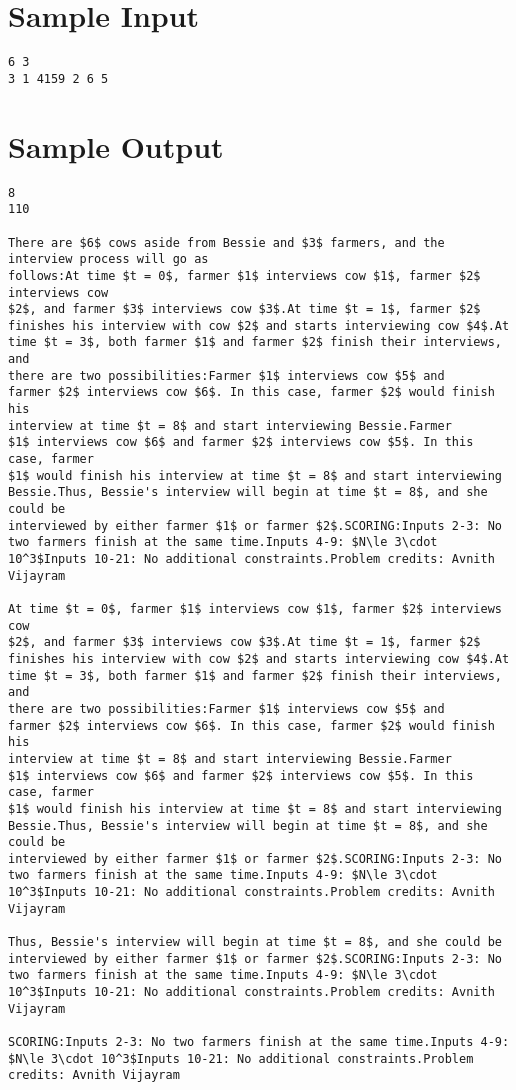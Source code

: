 \documentclass[12pt]{article}
\begin{document}
\section*{Sample Input}
\begin{verbatim}
6 3
3 1 4159 2 6 5
\end{verbatim}

\section*{Sample Output}
\begin{verbatim}
8
110

There are $6$ cows aside from Bessie and $3$ farmers, and the interview process will go as
follows:At time $t = 0$, farmer $1$ interviews cow $1$, farmer $2$ interviews cow
$2$, and farmer $3$ interviews cow $3$.At time $t = 1$, farmer $2$
finishes his interview with cow $2$ and starts interviewing cow $4$.At time $t = 3$, both farmer $1$ and farmer $2$ finish their interviews, and
there are two possibilities:Farmer $1$ interviews cow $5$ and
farmer $2$ interviews cow $6$. In this case, farmer $2$ would finish his
interview at time $t = 8$ and start interviewing Bessie.Farmer
$1$ interviews cow $6$ and farmer $2$ interviews cow $5$. In this case, farmer
$1$ would finish his interview at time $t = 8$ and start interviewing
Bessie.Thus, Bessie's interview will begin at time $t = 8$, and she could be
interviewed by either farmer $1$ or farmer $2$.SCORING:Inputs 2-3: No two farmers finish at the same time.Inputs 4-9: $N\le 3\cdot 10^3$Inputs 10-21: No additional constraints.Problem credits: Avnith Vijayram

At time $t = 0$, farmer $1$ interviews cow $1$, farmer $2$ interviews cow
$2$, and farmer $3$ interviews cow $3$.At time $t = 1$, farmer $2$
finishes his interview with cow $2$ and starts interviewing cow $4$.At time $t = 3$, both farmer $1$ and farmer $2$ finish their interviews, and
there are two possibilities:Farmer $1$ interviews cow $5$ and
farmer $2$ interviews cow $6$. In this case, farmer $2$ would finish his
interview at time $t = 8$ and start interviewing Bessie.Farmer
$1$ interviews cow $6$ and farmer $2$ interviews cow $5$. In this case, farmer
$1$ would finish his interview at time $t = 8$ and start interviewing
Bessie.Thus, Bessie's interview will begin at time $t = 8$, and she could be
interviewed by either farmer $1$ or farmer $2$.SCORING:Inputs 2-3: No two farmers finish at the same time.Inputs 4-9: $N\le 3\cdot 10^3$Inputs 10-21: No additional constraints.Problem credits: Avnith Vijayram

Thus, Bessie's interview will begin at time $t = 8$, and she could be
interviewed by either farmer $1$ or farmer $2$.SCORING:Inputs 2-3: No two farmers finish at the same time.Inputs 4-9: $N\le 3\cdot 10^3$Inputs 10-21: No additional constraints.Problem credits: Avnith Vijayram

SCORING:Inputs 2-3: No two farmers finish at the same time.Inputs 4-9: $N\le 3\cdot 10^3$Inputs 10-21: No additional constraints.Problem credits: Avnith Vijayram
\end{verbatim}
\end{document}
